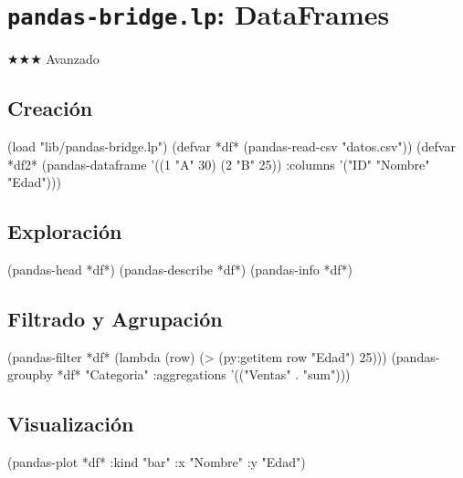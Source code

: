 \chapter{\texttt{pandas-bridge.lp}: DataFrames}
\label{chap:pandas-bridge}
{\huge$\bigstar$}{\huge$\bigstar$}{\huge$\bigstar$} Avanzado

\section{Creación}
\begin{lispcode}
(load "lib/pandas-bridge.lp")
(defvar *df* (pandas-read-csv "datos.csv"))
(defvar *df2* (pandas-dataframe '((1 "A" 30) (2 "B" 25))
                :columns '("ID" "Nombre" "Edad")))
\end{lispcode}

\section{Exploración}
\begin{lispcode}
(pandas-head *df*)
(pandas-describe *df*)
(pandas-info *df*)
\end{lispcode}

\section{Filtrado y Agrupación}
\begin{lispcode}
(pandas-filter *df* (lambda (row) (> (py:getitem row "Edad") 25)))
(pandas-groupby *df* "Categoria" :aggregations '(("Ventas" . "sum")))
\end{lispcode}

\section{Visualización}
\begin{lispcode}
(pandas-plot *df* :kind "bar" :x "Nombre" :y "Edad")
\end{lispcode}

